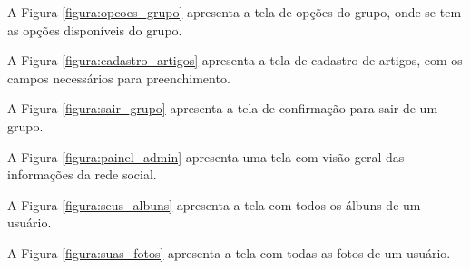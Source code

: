 A Figura \ref{figura:opcoes_grupo} apresenta a tela de opções do grupo, onde se tem as opções disponíveis do grupo.


A Figura \ref{figura:cadastro_artigos} apresenta a tela de cadastro de artigos, com os campos necessários para preenchimento.


A Figura \ref{figura:sair_grupo} apresenta a tela de confirmação para sair de um grupo.


A Figura \ref{figura:painel_admin} apresenta uma tela com visão geral das informações da rede social.


A Figura \ref{figura:seus_albuns} apresenta a tela com todos os álbuns de um usuário.


A Figura \ref{figura:suas_fotos} apresenta a tela com todas as fotos de um usuário.


